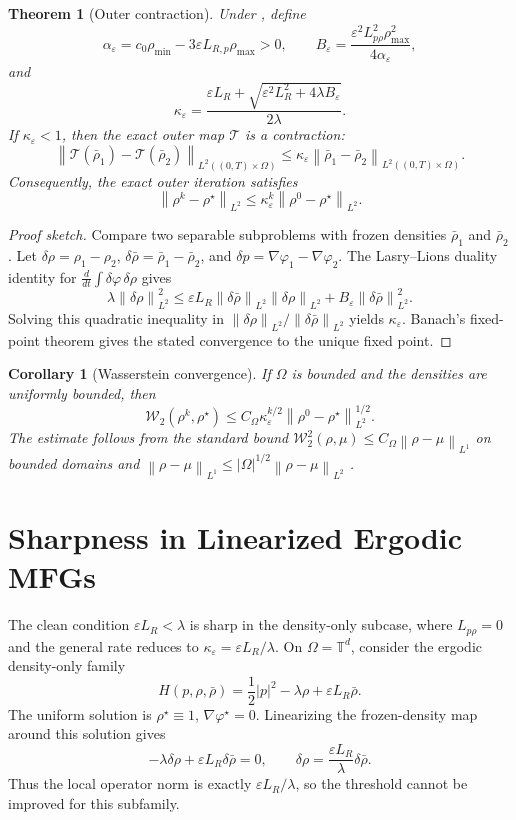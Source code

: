 \documentclass{article}
\newtheorem{theorem}{Theorem}
\newtheorem{corollary}{Corollary}
\newcommand{\T}{\mathbb{T}}
\newcommand{\W}{\mathcal{W}}
\newcommand{\eps}{\varepsilon}
\newcommand{\norm}[1]{\left\lVert #1 \right\rVert}
\begin{document}
\begin{theorem}[Outer contraction]
\label{thm:l2_contraction_neurips}
Under , define
\[
  \alpha_\eps=c_0\rho_{\min}-3\eps L_{R,p}\rho_{\max}>0,\qquad
  B_\eps=\frac{\eps^2L_{p\rho}^2\rho_{\max}^2}{4\alpha_\eps},
\]
and
\[
  \kappa_\eps=
  \frac{\eps L_R+\sqrt{\eps^2L_R^2+4\lambda B_\eps}}{2\lambda}.
\]
If \(\kappa_\eps<1\), then the exact
outer map \(\mathcal{T}\) is a contraction:
\[
  \norm{\mathcal{T}(\bar\rho_1)-\mathcal{T}(\bar\rho_2)}_{L^2((0,T)\times\Omega)}
  \leq
  \kappa_\eps\norm{\bar\rho_1-\bar\rho_2}_{L^2((0,T)\times\Omega)} .
\]
Consequently, the exact outer iteration satisfies
\[
  \norm{\rho^k-\rho^\star}_{L^2}
  \leq
  \kappa_\eps^k\norm{\rho^0-\rho^\star}_{L^2}.
\]
\end{theorem}

\begin{proof}[Proof sketch]
Compare two separable subproblems with frozen densities \(\bar\rho_1\) and
\(\bar\rho_2\).  Let \(\delta\rho=\rho_1-\rho_2\),
\(\delta\bar\rho=\bar\rho_1-\bar\rho_2\), and
\(\delta p=\nabla\varphi_1-\nabla\varphi_2\).  The Lasry--Lions duality identity
for \(\frac{d}{dt}\int\delta\varphi\,\delta\rho\) gives
\[
  \lambda\norm{\delta\rho}_{L^2}^2
  \leq
  \eps L_R\norm{\delta\bar\rho}_{L^2}\norm{\delta\rho}_{L^2}
  + B_\eps\norm{\delta\bar\rho}_{L^2}^2 .
\]
Solving this quadratic inequality in
\(\norm{\delta\rho}_{L^2}/\norm{\delta\bar\rho}_{L^2}\) yields
\(\kappa_\eps\).  Banach's fixed-point theorem gives the stated convergence to
the unique fixed point.
\end{proof}

\begin{corollary}[Wasserstein convergence]
If \(\Omega\) is bounded and the densities are uniformly bounded, then
\[
  \W_2(\rho^k,\rho^\star)
  \leq
  C_\Omega \kappa_\eps^{k/2}\norm{\rho^0-\rho^\star}_{L^2}^{1/2}.
\]
The estimate follows from the standard bound
\(\W_2^2(\rho,\mu)\leq C_\Omega\norm{\rho-\mu}_{L^1}\) on bounded domains and
\(\norm{\rho-\mu}_{L^1}\leq |\Omega|^{1/2}\norm{\rho-\mu}_{L^2}\)
\citep{villani2009optimal}.
\end{corollary}

\section{Sharpness in Linearized Ergodic MFGs}

The clean condition \(\eps L_R<\lambda\) is sharp in the density-only subcase,
where \(L_{p\rho}=0\) and the general rate reduces to
\(\kappa_\eps=\eps L_R/\lambda\).  On \(\Omega=\T^d\), consider the ergodic
density-only family
\[
  H(p,\rho,\bar\rho)=\frac12 |p|^2-\lambda\rho+\eps L_R\bar\rho .
\]
The uniform solution is \(\rho^\star\equiv1\), \(\nabla\varphi^\star=0\).
Linearizing the frozen-density map around this solution gives
\[
  -\lambda\delta\rho+\eps L_R\delta\bar\rho=0,
  \qquad
  \delta\rho=\frac{\eps L_R}{\lambda}\delta\bar\rho .
\]
Thus the local operator norm is exactly \(\eps L_R/\lambda\), so the threshold
cannot be improved for this subfamily.
\end{document}
